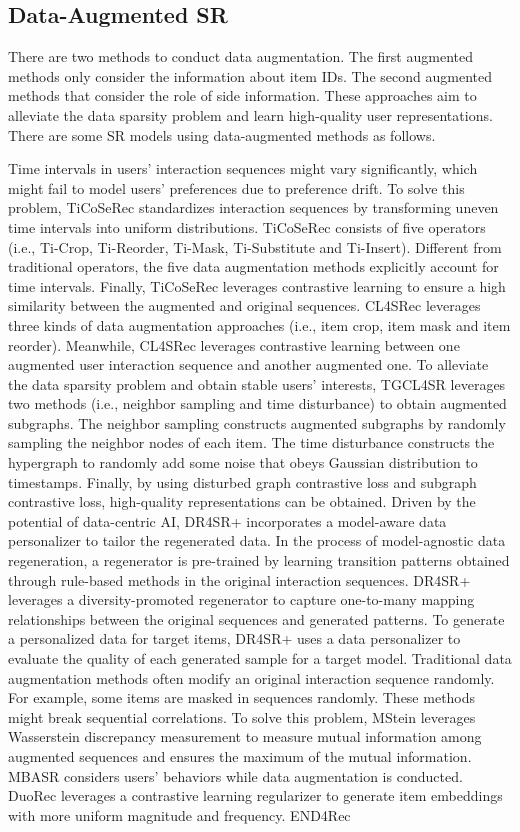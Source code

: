 \documentclass[review]{fcs}
\begin{document}
	\subsection{Data-Augmented SR}
	There are two methods to conduct data augmentation. The first augmented methods only consider the information about item IDs. The second augmented methods that consider the role of side information. These approaches aim to alleviate the data sparsity problem and learn high-quality user representations. There are some SR models using data-augmented methods as follows.
	
	Time intervals in users' interaction sequences might vary significantly, which might fail to model users’ preferences due to preference drift. To solve this problem, TiCoSeRec \cite{TiCoSeRec} standardizes interaction sequences by transforming uneven time intervals into uniform distributions. TiCoSeRec consists of five operators (i.e., Ti-Crop, Ti-Reorder, Ti-Mask, Ti-Substitute and Ti-Insert). Different from traditional operators, the five data augmentation methods explicitly account for time intervals. Finally, TiCoSeRec leverages contrastive learning to ensure a high similarity between the augmented and original sequences. CL4SRec \cite{CL4SRec} leverages three kinds of data augmentation approaches (i.e., item crop, item mask and item reorder). Meanwhile, CL4SRec leverages contrastive learning between one augmented user interaction sequence and another augmented one. To alleviate the data sparsity problem and obtain stable users’ interests, TGCL4SR \cite{TGCL4SR} leverages two methods (i.e., neighbor sampling and time disturbance) to obtain augmented subgraphs. The neighbor sampling constructs augmented subgraphs by randomly sampling the neighbor nodes of each item. The time disturbance constructs the hypergraph to randomly add some noise that obeys Gaussian distribution to timestamps. Finally, by using disturbed graph contrastive loss and subgraph contrastive loss, high-quality representations can be obtained. Driven by the potential of data-centric AI, DR4SR+ \cite{DR4SR+} incorporates a model-aware data personalizer to tailor the regenerated data. In the process of model-agnostic data regeneration, a regenerator is pre-trained by learning transition patterns obtained through rule-based methods in the original interaction sequences. DR4SR+ leverages a diversity-promoted regenerator to capture one-to-many mapping relationships between the original sequences and generated patterns. To generate a personalized data for target items, DR4SR+ uses a data personalizer to evaluate the quality of each generated sample for a target model. Traditional data augmentation methods often modify an original interaction sequence randomly. For example, some items are masked in sequences randomly. These methods might break sequential correlations. To solve this problem, MStein \cite{MStein} leverages Wasserstein discrepancy measurement to measure mutual information among augmented sequences and ensures the maximum of the mutual information. MBASR \cite{MBASR} considers users’ behaviors while data augmentation is conducted. DuoRec \cite{DuoRec} leverages a contrastive learning regularizer to generate item embeddings with more uniform magnitude and frequency. END4Rec 
\end{document}
